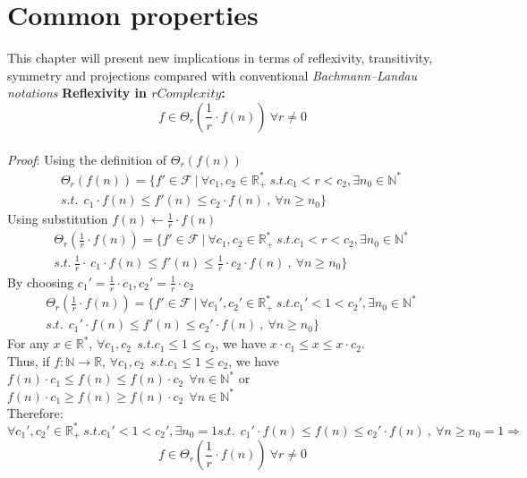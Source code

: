 \section{Common properties}
This chapter will present new implications in terms of reflexivity, transitivity, symmetry and projections compared with conventional \textit{Bachmann–Landau notations}
 \hfill\break
 \textbf{Reflexivity in $rComplexity$:}  \[ f \in \Theta_{r} \left( \frac{1}{r} \cdot f(n) \right)\ \forall r \neq 0 \]
   \\\textit{Proof}:
    Using the definition of $ \Theta_{r}(f(n))$
    \[\begin{split} \Theta_{r}(f(n)) = \lbrace f' \in \mathcal{F}\ |\ \forall c_{1}, c_{2} \in \mathbb{R}^{*}_{+} \ s.t.  c_{1}< r < c_{2} , \exists n_{0} \in \mathbb{N}^{*}\ \\ s.t.\ \ c_{1} \cdot f(n) \leq f'(n) \leq c_{2} \cdot f(n)\ ,\  \forall n \geq n_{0} \rbrace \end{split} \]
    Using substitution $ f(n) \longleftarrow \frac{1}{r} \cdot f(n)$
    \[\begin{split} \Theta_{r} \left( \frac{1}{r} \cdot f(n) \right) = \lbrace f' \in \mathcal{F}\ |\ \forall c_{1}, c_{2} \in \mathbb{R}^{*}_{+} \ s.t.  c_{1}< r < c_{2} , \exists n_{0} \in \mathbb{N}^{*}\ \\ s.t.\ \frac{1}{r} \cdot \ c_{1} \cdot f(n) \leq  f'(n) \leq \frac{1}{r} \cdot c_{2} \cdot f(n)\ ,\  \forall n \geq n_{0} \rbrace \end{split} \]
    By choosing $c_{1}' = \frac{1}{r} \cdot c_{1}, c_{2}' = \frac{1}{r} \cdot c_{2}$
   \[\begin{split} \Theta_{r} \left( \frac{1}{r} \cdot f(n) \right) = \lbrace f' \in \mathcal{F}\ |\ \forall c_{1}', c_{2}' \in \mathbb{R}^{*}_{+} \ s.t.  c_{1}'< 1 < c_{2}' , \exists n_{0} \in \mathbb{N}^{*}\ \\ s.t.\  \ c_{1}' \cdot f(n) \leq  f'(n) \leq c_{2}' \cdot f(n)\ ,\  \forall n \geq n_{0} \rbrace \end{split} \]
	For any $x \in \mathbb{R}^{*}$,  $\forall c_{1}, c_{2}\ \ s.t.  c_{1} \leq 1 \leq c_{2}$, we have $ x \cdot c_{1} \leq x \leq x \cdot c_{2} $. \\
   	Thus, if $f:\mathbb{N}\longrightarrow\mathbb{R}$, $\forall c_{1}, c_{2}\ \  s.t.  c_{1} \leq 1 \leq c_{2}$, we have $f(n) \cdot c_{1} \leq f(n) \leq f(n) \cdot c_{2}\ \ \forall n \in \mathbb{N}^{*}$ or $f(n) \cdot c_{1} \geq f(n) \geq f(n) \cdot c_{2}\ \ \forall n \in \mathbb{N}^{*}$\\
   	Therefore:
   	\[\forall c_{1}', c_{2}' \in \mathbb{R}^{*}_{+} \ s.t.  c_{1}'< 1 < c_{2}' , \exists n_{0} = 1  s.t.\  \ c_{1}' \cdot f(n) \leq  f(n) \leq c_{2}' \cdot f(n)\ ,\  \forall n \geq n_{0}=1 \Rightarrow \]
   	\[ f \in \Theta_{r} \left( \frac{1}{r} \cdot f(n) \right)\ \forall r \neq 0 \]
\qedsymbol
 
